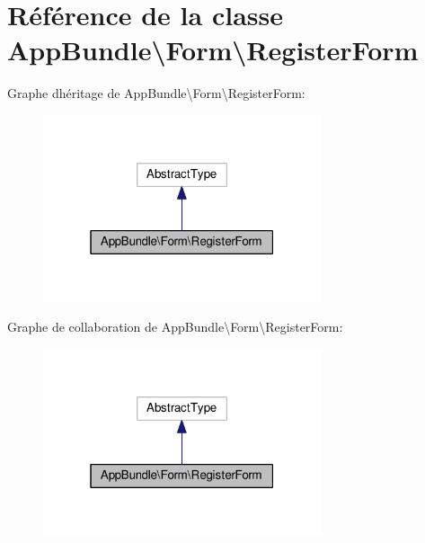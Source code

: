 \hypertarget{classAppBundle_1_1Form_1_1RegisterForm}{}\section{Référence de la classe App\+Bundle\textbackslash{}Form\textbackslash{}Register\+Form}
\label{classAppBundle_1_1Form_1_1RegisterForm}


Graphe d\textquotesingle{}héritage de App\+Bundle\textbackslash{}Form\textbackslash{}Register\+Form\+:\nopagebreak
\begin{figure}[H]
\begin{center}
\leavevmode
\includegraphics[width=232pt]{classAppBundle_1_1Form_1_1RegisterForm__inherit__graph}
\end{center}
\end{figure}


Graphe de collaboration de App\+Bundle\textbackslash{}Form\textbackslash{}Register\+Form\+:\nopagebreak
\begin{figure}[H]
\begin{center}
\leavevmode
\includegraphics[width=232pt]{classAppBundle_1_1Form_1_1RegisterForm__coll__graph}
\end{center}
\end{figure}
